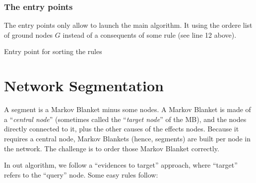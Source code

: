 \documentclass[a4paper]{article}
\newcommand*{\say}[1]{``{#1}''}
\begin{document}
\subsubsection{The entry points}

The entry points only allow to launch the main algorithm.
It using the ordere list of ground nodes $G$ instead of a consequents of some rule (see line 12 above).


\begin{algorithm2e}[H]
  \caption{Entry point for sorting the rules}


\end{algorithm2e}



\pagebreak[4]


\section{Network Segmentation}

A segment is a Markov Blanket minus some nodes.
A Markov Blanket is made of a \say{\emph{central node}} (sometimes called the \say{\emph{target node}} of the MB),
and the nodes directly connected to it, plus the other causes of the effects nodes.
Because it requires a central node, Markov Blankets (hence, segments) are built per node in the network.
The challenge is to order those Markov Blanket correctly.

In out algorithm, we follow a \say{evidences to target} approach, where \say{target} refers to the \say{query} node.
Some easy rules follow:
\end{document}
